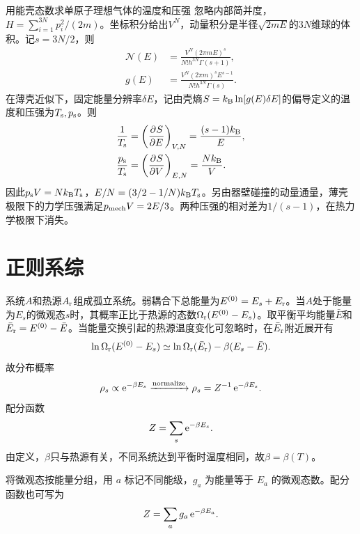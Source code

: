 \begin{example}{用能壳态数求单原子理想气体的温度和压强}{}
	忽略内部简并度，$\textstyle H = \sum_{i=1}^{3N}p_i^2/(2m)$。坐标积分给出$V^N$，动量积分是半径$\sqrt{2mE}$的$3N$维球的体积。记$s = 3N/2$，则
	\begin{subequations}
		\begin{align}
			\mathcal N(E) &= \frac{V^N(2\pi m E)^s}{N!h^{3N}\Gamma(s + 1)},\\
			g(E) &= \frac{V^N(2\pi m)^s E^{s-1}}{N!h^{3N}\Gamma(s)}. \label{eqn:microcanonical ideal gas density}
		\end{align}
	\end{subequations}
	在薄壳近似下，固定能量分辨率$\delta E$，记由壳熵$S = k_{\mathrm{B}}\ln[g(E)\delta E]$的偏导定义的温度和压强为$T_{\rm s},p_{\rm s}$。则
	\begin{align*}
		\frac1{T_{\rm s}} &= \biggl(\frac{\partial^{}S}{\partial{E}^{}}\biggr)_{V,N} = \frac{(s - 1)k_{\mathrm{B}}}{E},\\
		\frac {p_{\rm s}}{T_{\rm s}} &= \biggl(\frac{\partial^{}S}{\partial{V}^{}}\biggr)_{E,N} = \frac{Nk_{\mathrm{B}}}{V}.
	\end{align*}
	因此$p_{\rm s}V = Nk_{\mathrm{B}} T_{\rm s}$，$E/N = (3/2 - 1/N)k_{\mathrm{B}} T_{\rm s}$。另由器壁碰撞的动量通量，薄壳极限下的力学压强满足$p_{\rm mech}V = 2E/3$。两种压强的相对差为$1/(s - 1)$，在热力学极限下消失。
\end{example}

\section{正则系综}

系统$A$和热源$A_\mathrm r$组成孤立系统。弱耦合下总能量为$E^{(0)} = E_s + E_\mathrm r$。当$A$处于能量为$E_s$的微观态$s$时，其概率正比于热源的态数$\Omega_\mathrm r(E^{(0)} - E_s)$。取平衡平均能量$\bar E$和$\bar E_\mathrm r = E^{(0)} - \bar E$。当能量交换引起的热源温度变化可忽略时，在$\bar E_\mathrm r$附近展开有
\[
	\ln\Omega_\mathrm r(E^{(0)} - E_s) \simeq \ln\Omega_\mathrm r(\bar E_\mathrm r) - \beta(E_s - \bar E).
\]
故分布概率
\begin{equation}
	\label{eq:sm-canonical-state-probability}
	\rho_s \propto \mathop{}\!\mathrm{e}^{-\beta E_s}\xrightarrow{\text{normalize}}\rho_s = Z^{-1}\mathop{}\!\mathrm{e}^{-\beta E_s}.
\end{equation}
配分函数
\begin{equation}
	\label{eq:sm-canonical-partition}
	Z = \sum_s\mathop{}\!\mathrm{e}^{-\beta E_s}.
\end{equation}
由定义，$\beta$只与热源有关，不同系统达到平衡时温度相同，故$\beta = \beta(T)$。

将微观态按能量分组，用 $a$ 标记不同能级，$g_a$ 为能量等于 $E_a$ 的微观态数。配分函数也可写为
\begin{align}
	Z = \sum_a g_a\mathop{}\!\mathrm{e}^{-\beta E_a}.
\end{align}
